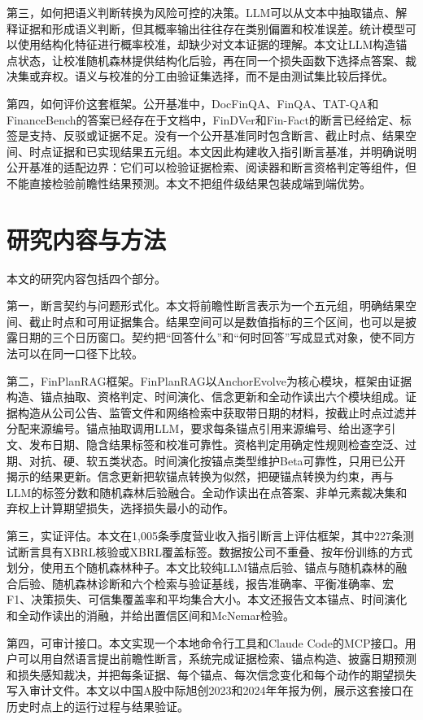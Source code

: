 第三，如何把语义判断转换为风险可控的决策。LLM可以从文本中抽取锚点、解释证据和形成语义判断，但其概率输出往往存在类别偏置和校准误差。统计模型可以使用结构化特征进行概率校准，却缺少对文本证据的理解。本文让LLM构造锚点状态，让校准随机森林提供结构化后验，再在同一个损失函数下选择点答案、裁决集或弃权。语义与校准的分工由验证集选择，而不是由测试集比较后择优。

第四，如何评价这套框架。公开基准中，DocFinQA、FinQA、TAT-QA和FinanceBench的答案已经存在于文档中，FinDVer和Fin-Fact的断言已经给定、标签是支持、反驳或证据不足。没有一个公开基准同时包含断言、截止时点、结果空间、时点证据和已实现结果五元组。本文因此构建收入指引断言基准，并明确说明公开基准的适配边界：它们可以检验证据检索、阅读器和断言资格判定等组件，但不能直接检验前瞻性结果预测。本文不把组件级结果包装成端到端优势。

\section{研究内容与方法}

本文的研究内容包括四个部分。

第一，断言契约与问题形式化。本文将前瞻性断言表示为一个五元组，明确结果空间、截止时点和可用证据集合。结果空间可以是数值指标的三个区间，也可以是披露日期的三个日历窗口。契约把“回答什么”和“何时回答”写成显式对象，使不同方法可以在同一口径下比较。

第二，FinPlanRAG框架。FinPlanRAG以AnchorEvolve为核心模块，框架由证据构造、锚点抽取、资格判定、时间演化、信念更新和全动作读出六个模块组成。证据构造从公司公告、监管文件和网络检索中获取带日期的材料，按截止时点过滤并分配来源编号。锚点抽取调用LLM，要求每条锚点引用来源编号、给出逐字引文、发布日期、隐含结果标签和校准可靠性。资格判定用确定性规则检查空泛、过期、对抗、硬、软五类状态。时间演化按锚点类型维护Beta可靠性，只用已公开揭示的结果更新。信念更新把软锚点转换为似然，把硬锚点转换为约束，再与LLM的标签分数和随机森林后验融合。全动作读出在点答案、非单元素裁决集和弃权上计算期望损失，选择损失最小的动作。

第三，实证评估。本文在1,005条季度营业收入指引断言上评估框架，其中227条测试断言具有XBRL核验或XBRL覆盖标签。数据按公司不重叠、按年份训练的方式划分，使用五个随机森林种子。本文比较纯LLM锚点后验、锚点与随机森林的融合后验、随机森林诊断和六个检索与验证基线，报告准确率、平衡准确率、宏F1、决策损失、可信集覆盖率和平均集合大小。本文还报告文本锚点、时间演化和全动作读出的消融，并给出置信区间和McNemar检验。

第四，可审计接口。本文实现一个本地命令行工具和Claude Code的MCP接口。用户可以用自然语言提出前瞻性断言，系统完成证据检索、锚点构造、披露日期预测和损失感知裁决，并把每条证据、每个锚点、每次信念变化和每个动作的期望损失写入审计文件。本文以中国A股中际旭创2023和2024年年报为例，展示这套接口在历史时点上的运行过程与结果验证。

